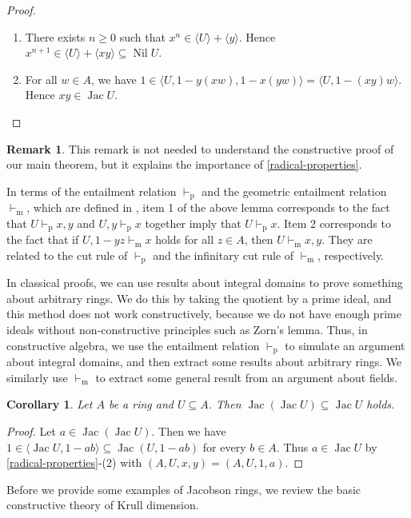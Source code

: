 \documentclass[11pt]{article}
\newtheorem{corollary}{Corollary}[section]
\theoremstyle{definition}
\newtheorem{remark}{Remark}[section]
\newcommand\gen[1]{\langle{#1}\rangle}
\DeclareMathOperator{\Nil}{Nil}
\DeclareMathOperator{\Jac}{Jac}
\begin{document}
\begin{proof}
    \begin{enumerate}
        \item There exists $n\ge0$ such that $x^n\in\gen U+\gen{y}$. Hence $x^{n+1}\in\gen U+\gen{xy}\subseteq\Nil U$.
        \item For all $w\in A$, we have $1\in\gen{U,1-y(xw),1-x(yw)}=\gen{U,1-(xy)w}$. Hence $xy\in\Jac U$.\qedhere
    \end{enumerate}
\end{proof}
\begin{remark}\label{dynamical}
    This remark is not needed to understand the constructive proof of our main theorem, but it explains the importance of \cref{radical-properties}.
    
    In terms of the entailment relation $\vdash_{\mathrm{p}}$ and the geometric entailment relation $\vdash_{\mathrm{m}}$, which are defined in \cite{SW21}, item 1 of the above lemma corresponds to the fact that $U\vdash_{\mathrm{p}} x,y$ and $U,y\vdash_{\mathrm{p}} x$ together imply that $U\vdash_{\mathrm{p}} x$. Item 2 corresponds to the fact that if $U,1-yz\vdash_{\mathrm{m}}x$ holds for all $z\in A$, then $U\vdash_{\mathrm{m}} x,y$. They are related to the cut rule of $\vdash_{\mathrm{p}}$ and the infinitary cut rule of $\vdash_{\mathrm{m}}$, respectively.

    In classical proofs, we can use results about integral domains to prove something about arbitrary rings.
    We do this by taking the quotient by a prime ideal, and this method does not work constructively, because we do not have enough prime ideals without non-constructive principles such as Zorn's lemma.
    Thus, in constructive algebra, we use the entailment relation $\vdash_{\mathrm{p}}$ to simulate an argument about integral domains, and then extract some results about arbitrary rings.
    We similarly use $\vdash_{\mathrm{m}}$ to extract some general result from an argument about fields.
\end{remark}
\begin{corollary}\label{idempotence}
    Let $A$ be a ring and $U\subseteq A$. Then $\Jac(\Jac U)\subseteq\Jac U$ holds.
\end{corollary}
\begin{proof}
    Let $a\in\Jac(\Jac U)$.
    Then we have $1\in\gen{\Jac U,1-ab}\subseteq\Jac (U,1-ab)$ for every $b\in A$.
    Thus $a\in\Jac U$ by \cref{radical-properties}-(2) with $(A,U,x,y)=(A,U,1,a)$.
\end{proof}
Before we provide some examples of Jacobson rings, we review the basic constructive theory of Krull dimension.
\end{document}
